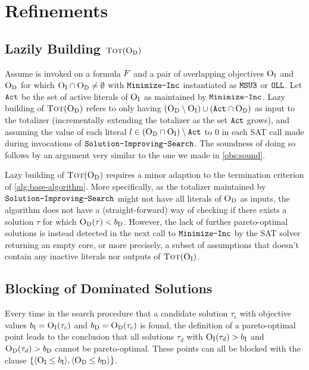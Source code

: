 \section{Refinements\label{sec:refinements}}

\subsection{Lazily Building $\textsc{Tot}(\textsc{O}_{\text{D}})$}

Assume \algname{} is invoked on a formula $F$ and a pair of overlapping objectives $\textsc{O}_{\text{I}}$ and $\textsc{O}_{\text{D}}$ for which 
$\textsc{O}_{\text{I}} \cap \textsc{O}_{\text{D}} \neq \emptyset$ with $\texttt{Minimize-\allowbreak{}Inc}$ instantiated as $\texttt{MSU3}$ or $\texttt{OLL}$. Let $\texttt{Act}$ be the set of active literals of $\textsc{O}_{\text{I}}$ as maintained by 
$\texttt{Minimize-\allowbreak{}Inc}$. Lazy building of $\textsc{Tot}(\textsc{O}_{\text{D}})$ refers to only having $(\textsc{O}_{\text{D}} \setminus \textsc{O}_{\text{I}}) \cup  (\texttt{Act} \cap \textsc{O}_{\text{D}})$ as input to the totalizer (incrementally extending the totalizer as the set $\texttt{Act}$ grows),  
and assuming the value of each literal $l \in (\textsc{O}_{\text{D}} \cap \textsc{O}_{\text{I}}) \setminus \texttt{Act}$ to $0$ in each SAT  call made during invocations of $\texttt{Solution-\allowbreak{}Improving-\allowbreak{}Search}$.
The soundness of doing so follows by an argument very similar to the one we made in \cref{obs:sound}. 

Lazy building of $\textsc{Tot}(\textsc{O}_{\text{D}})$ requires a minor adaption to the termination criterion of \cref{alg:base-algorithm}. More specifically, as the totalizer maintained by $\texttt{Solution-\allowbreak{}Improving-\allowbreak{}Search}$ might not have all literals of $\textsc{O}_{\text{D}}$ as inputs, the algorithm does not have a (straight-forward) way of checking if there exists a solution $\tau$ for which $\textsc{O}_{\text{D}}(\tau) < b_{\text{D}}$. However, the 
lack of further pareto-optimal  solutions is instead detected in the next call to $\texttt{Minimize-\allowbreak{}Inc}$ by the SAT solver returning an empty core, or more precisely, a subset of assumptions that doesn't contain any inactive literals nor outputs of $\textsc{Tot}(\textsc{O}_{\text{I}})$.

\subsection{Blocking of Dominated Solutions}

Every time in the search procedure that a candidate solution $\tau_c$ with objective values $b_{\text{I}} = \textsc{O}_{\text{I}}(\tau_c)$ and $b_{\text{D}} = \textsc{O}_{\text{D}}(\tau_c)$ is found, the definition of a pareto-optimal point leads to the conclusion that all solutions $\tau_d$ with $\textsc{O}_{\text{I}}(\tau_d) > b_{\text{I}}$ and $\textsc{O}_{\text{D}}(\tau_d) > b_{\text{D}}$ cannot be pareto-optimal.
These points can all be blocked with the clause $\{ \langle \textsc{O}_{\text{I}} \leq b_{\text{I}} \rangle, \langle \textsc{O}_{\text{D}} \leq b_{\text{D}} \rangle \}$.

